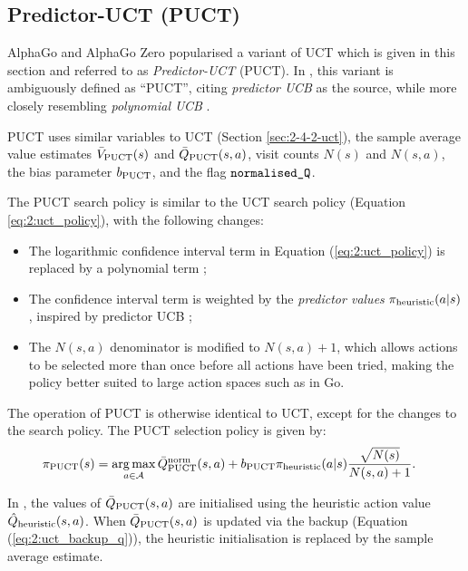\subsection{Predictor-UCT (PUCT)}
\label{sec:2-4-3-puct}

    AlphaGo and AlphaGo Zero \cite{alpha_go,alpha_go_zero} popularised a variant of UCT which is given in this section and referred to as \textit{Predictor-UCT} (PUCT). In \cite{alpha_go}, this variant is ambiguously defined as ``PUCT'', citing \textit{predictor UCB} \cite{prio_ucb} as the source, while more closely resembling \textit{polynomial UCB} \cite{poly_uct}.

    PUCT uses similar variables to UCT (Section \ref{sec:2-4-2-uct}), the sample average value estimates ${\bar{V}_{{\textnormal{PUCT}}}}(s)$ and ${\bar{Q}_{{\textnormal{PUCT}}}}(s,a)$, visit counts $N(s)$ and $N(s,a)$, the bias parameter ${b_{{\textnormal{PUCT}}}}$, and the flag ${\textnormal{\texttt{normalised\_Q}}}$. 

    The PUCT search policy is similar to the UCT search policy (Equation \ref{eq:2:uct_policy}), with the following changes:
    \begin{itemize}
        \item The logarithmic confidence interval term in Equation (\ref{eq:2:uct_policy}) is replaced by a polynomial term \cite{poly_uct};
        \item The confidence interval term is weighted by the \textit{predictor values} ${\pi_{\textnormal{heuristic}}}(a|s)$, inspired by predictor UCB \cite{prio_ucb};
        \item The $N(s,a)$ denominator is modified to $N(s,a)+1$, which allows actions to be selected more than once before all actions have been tried, making the policy better suited to large action spaces such as in Go.
    \end{itemize}
    
    The operation of PUCT is otherwise identical to UCT, except for the changes to the search policy. The PUCT selection policy is given by:
    \begin{align}
        {\pi_{{\textnormal{PUCT}}}}(s) &= \operatorname*{arg\,max}_{a\in\mathcal{A}} {\bar{Q}^{{\textnormal{norm}}}_{{\textnormal{PUCT}}}}(s,a) + {b_{{\textnormal{PUCT}}}} {\pi_{\textnormal{heuristic}}}(a|s) \frac{\sqrt{N(s)}}{N(s,a)+1}. \label{eq:2:puct_policy}
    \end{align}

    In \thtspp, the values of ${\bar{Q}_{{\textnormal{PUCT}}}}(s,a)$ are initialised using the heuristic action value ${\hat{Q}_{\textnormal{heuristic}}}(s,a)$. When ${\bar{Q}_{{\textnormal{PUCT}}}}(s,a)$ is updated via the backup (Equation (\ref{eq:2:uct_backup_q})), the heuristic initialisation is replaced by the sample average estimate. 








